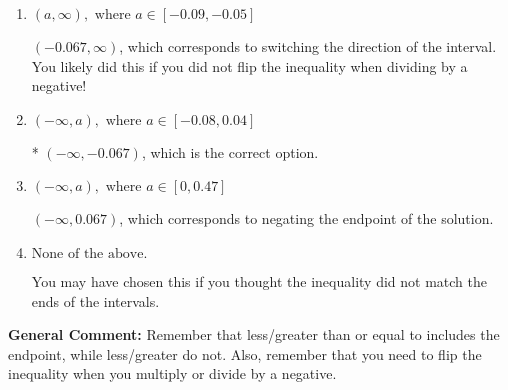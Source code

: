 \documentclass{extbook}[14pt]
\begin{document}
\begin{enumerate}
{\begin{enumerate}[label=\Alph*.]
 $(0.067, \infty)$, which corresponds to switching the direction of the interval AND negating the endpoint. You likely did this if you did not flip the inequality when dividing by a negative as well as not moving values over to a side properly.
\item \( (a, \infty), \text{ where } a \in [-0.09, -0.05] \)

 $(-0.067, \infty)$, which corresponds to switching the direction of the interval. You likely did this if you did not flip the inequality when dividing by a negative!
\item \( (-\infty, a), \text{ where } a \in [-0.08, 0.04] \)

* $(-\infty, -0.067)$, which is the correct option.
\item \( (-\infty, a), \text{ where } a \in [0, 0.47] \)

 $(-\infty, 0.067)$, which corresponds to negating the endpoint of the solution.
\item \( \text{None of the above}. \)

You may have chosen this if you thought the inequality did not match the ends of the intervals.
\end{enumerate}

\textbf{General Comment:} Remember that less/greater than or equal to includes the endpoint, while less/greater do not. Also, remember that you need to flip the inequality when you multiply or divide by a negative.
}
\end{enumerate}
\end{document}
